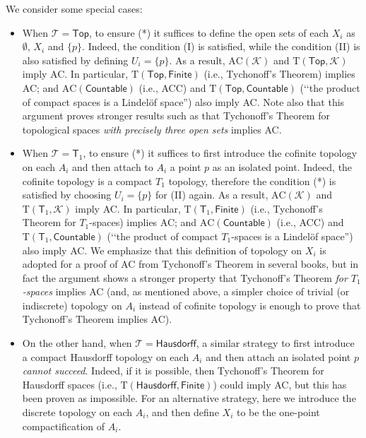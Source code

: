 \documentclass{article}
\begin{document}
We consider some special cases:
\begin{itemize}
\item When $\mathcal{T} = \mathsf{Top}$, to ensure (*) it suffices to define the open sets of each $X_i$ as $\emptyset$, $X_i$ and $\{p\}$.
Indeed, the condition (I) is satisfied, while the condition (II) is also satisfied by defining $U_i = \{p\}$.
As a result, $\mathrm{AC}(\mathcal{K})$ and $\mathrm{T}(\mathsf{Top},\mathcal{K})$ imply AC.
In particular, $\mathrm{T}(\mathsf{Top},\mathsf{Finite})$ (i.e., Tychonoff's Theorem) implies AC; and $\mathrm{AC}(\mathsf{Countable})$ (i.e., ACC) and $\mathrm{T}(\mathsf{Top},\mathsf{Countable})$ (\lq\lq the product of compact spaces is a Lindel\"{o}f space'') also imply AC.
Note also that this argument proves stronger results such as that Tychonoff's Theorem for topological spaces \emph{with precisely three open sets} implies AC.
\item When $\mathcal{T} = \mathsf{T}_1$, to ensure (*) it suffices to first introduce the cofinite topology on each $A_i$ and then attach to $A_i$ a point $p$ as an isolated point.
Indeed, the cofinite topology is a compact $T_1$ topology, therefore the condition (*) is satisfied by choosing $U_i = \{p\}$ for (II) again.
As a result, $\mathrm{AC}(\mathcal{K})$ and $\mathrm{T}(\mathsf{T}_1,\mathcal{K})$ imply AC.
In particular, $\mathrm{T}(\mathsf{T}_1,\mathsf{Finite})$ (i.e., Tychonoff's Theorem for $T_1$-spaces) implies AC; and $\mathrm{AC}(\mathsf{Countable})$ (i.e., ACC) and $\mathrm{T}(\mathsf{T}_1,\mathsf{Countable})$ (\lq\lq the product of compact $T_1$-spaces is a Lindel\"{o}f space'') also imply AC.
We emphasize that this definition of topology on $X_i$ is adopted for a proof of AC from Tychonoff's Theorem in several books, but in fact the argument shows a stronger property that Tychonoff's Theorem \emph{for $T_1$-spaces} implies AC (and, as mentioned above, a simpler choice of trivial (or indiscrete) topology on $A_i$ instead of cofinite topology is enough to prove that Tychonoff's Theorem implies AC).
\item On the other hand, when $\mathcal{T} = \mathsf{Hausdorff}$, a similar strategy to first introduce a compact Hausdorff topology on each $A_i$ and then attach an isolated point $p$ \emph{cannot succeed}.
Indeed, if it is possible, then Tychonoff's Theorem for Hausdorff spaces (i.e., $\mathrm{T}(\mathsf{Hausdorff},\mathsf{Finite})$) could imply AC, but this has been proven as impossible.
For an alternative strategy, here we introduce the discrete topology on each $A_i$, and then define $X_i$ to be the one-point compactification of $A_i$.

\end{itemize}
\end{document}
